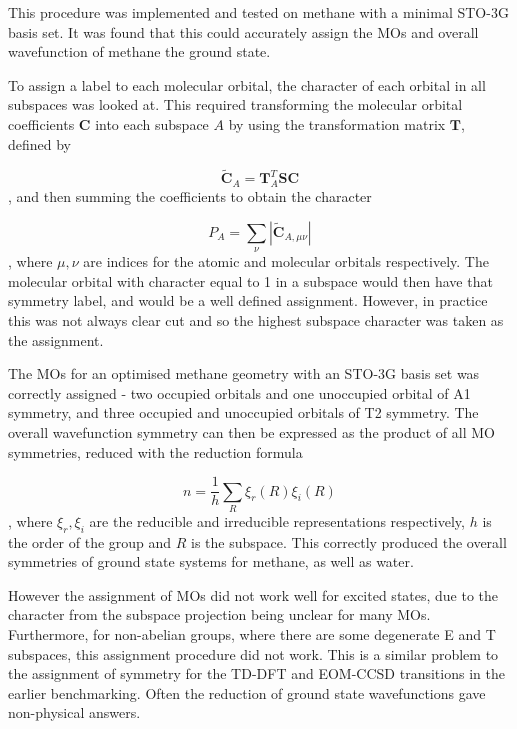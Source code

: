 This procedure was implemented and tested on methane with a minimal STO-3G basis set.
It was found that this could accurately assign the MOs and overall wavefunction of
methane the ground state.

To assign a label to each molecular orbital, the character of each orbital in all
subspaces was looked at. This required transforming the molecular orbital coefficients
$\mathbf{C}$ into each subspace $A$ by using the transformation matrix $\mathbf{T}$, 
defined by

\begin{equation}
\tilde{\mathbf{C}}_A = \mathbf{T}^T_A \mathbf{S} \mathbf{C}
\end{equation}
%
, and then summing the coefficients to obtain the character

\begin{equation}
P_A = \sum_{\nu} \left\lvert \tilde{\mathbf{C}}_{A, \mu\nu} \right\lvert  
\end{equation}
%
, where $\mu,\nu$ are indices for the atomic and molecular orbitals respectively. 
The molecular orbital with character equal to 1 in a subspace would then have that
symmetry label, and would be a well defined assignment. However, in practice this was
not always clear cut and so the highest subspace character was taken as the assignment.

The MOs for an optimised methane geometry with an STO-3G basis set was correctly
assigned  - two occupied orbitals and one unoccupied orbital of A1 symmetry,
and three occupied and unoccupied orbitals of T2 symmetry. The overall wavefunction
symmetry can then be expressed as the product of all MO symmetries, reduced with
the reduction formula

\begin{equation}
n = \frac{1}{h} \sum_R \xi_r \left( R \right) \xi_i \left( R \right)
\end{equation}
%
, where $\xi_r, \xi_i$ are the reducible and irreducible representations respectively,
$h$ is the order of the group and $R$ is the subspace. This correctly produced
the overall symmetries of ground state systems for methane, as well as water.

However the assignment of MOs did not work well for excited states, due to the
character from the subspace projection being unclear for many MOs. 
Furthermore, for non-abelian groups, where there are some degenerate E
and T subspaces, this assignment procedure did not work. This is a similar problem 
to the assignment of symmetry for the TD-DFT and EOM-CCSD transitions in the earlier 
benchmarking. Often the reduction of ground state wavefunctions gave non-physical answers.

